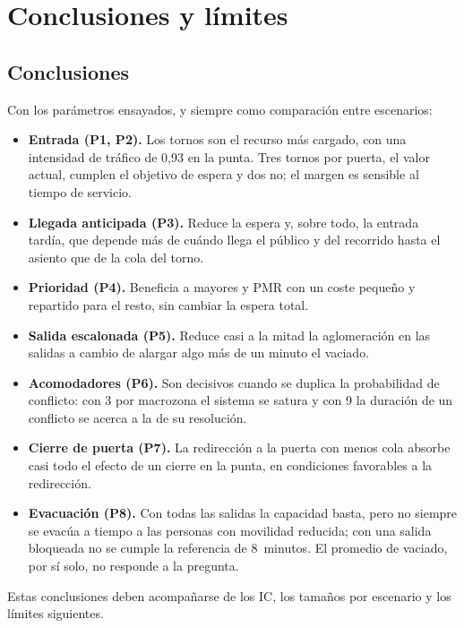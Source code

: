\section{Conclusiones y límites}\label{sec:conclusiones}

\subsection{Conclusiones}

Con los parámetros ensayados, y siempre como comparación entre escenarios:

\begin{itemize}
  \item \textbf{Entrada (P1, P2).} Los tornos son el recurso más cargado, con una
    intensidad de tráfico de 0,93 en la punta. Tres tornos por puerta, el valor
    actual, cumplen el objetivo de espera y dos no; el margen es sensible al
    tiempo de servicio.
  \item \textbf{Llegada anticipada (P3).} Reduce la espera y, sobre todo, la
    entrada tardía, que depende más de cuándo llega el público y del recorrido
    hasta el asiento que de la cola del torno.
  \item \textbf{Prioridad (P4).} Beneficia a mayores y PMR con un coste pequeño y
    repartido para el resto, sin cambiar la espera total.
  \item \textbf{Salida escalonada (P5).} Reduce casi a la mitad la aglomeración en
    las salidas a cambio de alargar algo más de un minuto el vaciado.
  \item \textbf{Acomodadores (P6).} Son decisivos cuando se duplica la probabilidad
    de conflicto: con 3 por macrozona el sistema se satura y con 9 la duración de
    un conflicto se acerca a la de su resolución.
  \item \textbf{Cierre de puerta (P7).} La redirección a la puerta con menos cola
    absorbe casi todo el efecto de un cierre en la punta, en condiciones
    favorables a la redirección.
  \item \textbf{Evacuación (P8).} Con todas las salidas la capacidad basta, pero no
    siempre se evacúa a tiempo a las personas con movilidad reducida; con una
    salida bloqueada no se cumple la referencia de 8~minutos. El promedio de
    vaciado, por sí solo, no responde a la pregunta.
\end{itemize}

Estas conclusiones deben acompañarse de los IC, los tamaños por escenario y los
límites siguientes.

